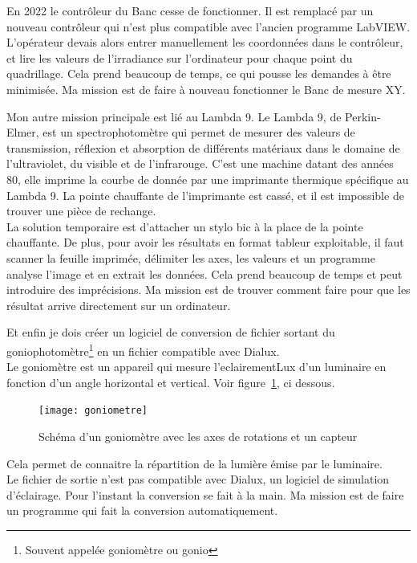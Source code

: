 \documentclass[12pt]{article}
\begin{document}
En 2022 le contrôleur du Banc cesse de fonctionner.
Il est remplacé par un nouveau contrôleur qui n'est plus compatible avec l'ancien programme LabVIEW.\\
L'opérateur devais alors entrer manuellement les coordonnées dans le contrôleur, et lire les valeurs de l'irradiance sur l'ordinateur pour chaque point du quadrillage.
Cela prend beaucoup de temps, ce qui pousse les demandes à être minimisée.
Ma mission est de faire à nouveau fonctionner le Banc de mesure XY.


Mon autre mission principale est lié au Lambda 9.
Le Lambda 9, de Perkin-Elmer, est un spectrophotomètre qui permet de mesurer des valeurs de transmission, réflexion et absorption de différents matériaux dans le domaine de l'ultraviolet, du visible et de l'infrarouge.
C'est une machine datant des années 80, elle imprime la courbe de donnée par une imprimante thermique spécifique au Lambda 9.
La pointe chauffante de l'imprimante est cassé, et il est impossible de trouver une pièce de rechange.\\
La solution temporaire est d'attacher un stylo bic à la place de la pointe chauffante.
De plus, pour avoir les résultats en format tableur exploitable, il faut scanner la feuille imprimée, délimiter les axes, les valeurs et un programme analyse l'image et en extrait les données.
Cela prend beaucoup de temps et peut introduire des imprécisions.
Ma mission est de trouver comment faire pour que les résultat arrive directement sur un ordinateur.



Et enfin je dois créer un logiciel de conversion de fichier sortant du goniophotomètre\footnote{Souvent appelée goniomètre ou gonio} en un fichier compatible avec Dialux.\\
Le goniomètre est un appareil qui mesure l'\gls{eclairementLux} d'un luminaire en fonction d'un angle horizontal et vertical.
Voir figure~\ref{fig:gonio}, ci dessous.
\begin{figure}[h]
	\centering
	\texttt{[image: goniometre]}
	\caption{Schéma d'un goniomètre avec les axes de rotations et un capteur}
	\label{fig:gonio}
\end{figure}
Cela permet de connaitre la répartition de la lumière émise par le luminaire.\\
Le fichier de sortie n'est pas compatible avec Dialux, un logiciel de simulation d'éclairage.
Pour l'instant la conversion se fait à la main. 
Ma mission est de faire un programme qui fait la conversion automatiquement.
\newpage
\end{document}
